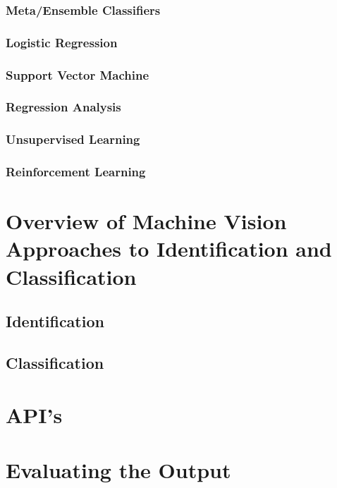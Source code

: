 \subsubsection{Meta/Ensemble Classifiers}
\subsubsection{Logistic Regression}
\subsubsection{Support Vector Machine}
\subsubsection{Regression Analysis}
\subsubsection{Unsupervised Learning}
\subsubsection{Reinforcement Learning}

\section{Overview of Machine Vision Approaches to Identification and Classification}
\subsection{Identification}
\subsection{Classification}

\section{API's}

\section{Evaluating the Output}


